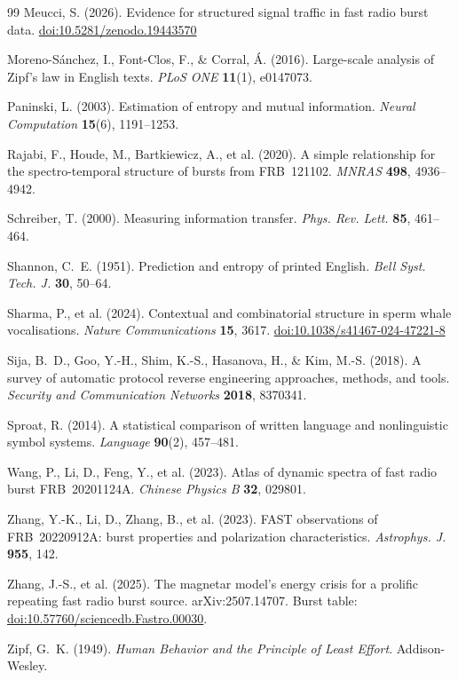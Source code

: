 \documentclass[11pt,a4paper]{article}
\providecommand{\doi}[1]{\href{https://doi.org/#1}{doi:#1}}
\begin{document}
\begin{thebibliography}{99}
 Meucci, S. (2026). Evidence for structured signal traffic in fast
radio burst data. \doi{10.5281/zenodo.19443570}

 Moreno-S\'anchez, I., Font-Clos, F., \& Corral, \'A. (2016).
Large-scale analysis of Zipf's law in English texts. \emph{PLoS ONE} \textbf{11}(1),
e0147073.

 Paninski, L. (2003). Estimation of entropy and mutual
information. \emph{Neural Computation} \textbf{15}(6), 1191--1253.

 Rajabi, F., Houde, M., Bartkiewicz, A., et al. (2020). A simple
relationship for the spectro-temporal structure of bursts from FRB~121102.
\emph{MNRAS} \textbf{498}, 4936--4942.

 Schreiber, T. (2000). Measuring information transfer.
\emph{Phys. Rev. Lett.} \textbf{85}, 461--464.

 Shannon, C.~E. (1951). Prediction and entropy of printed English.
\emph{Bell Syst. Tech. J.} \textbf{30}, 50--64.

 Sharma, P., et al. (2024). Contextual and combinatorial structure
in sperm whale vocalisations. \emph{Nature Communications} \textbf{15}, 3617.
\doi{10.1038/s41467-024-47221-8}

 Sija, B.~D., Goo, Y.-H., Shim, K.-S., Hasanova, H., \& Kim, M.-S.
(2018). A survey of automatic protocol reverse engineering approaches, methods, and
tools. \emph{Security and Communication Networks} \textbf{2018}, 8370341.

 Sproat, R. (2014). A statistical comparison of written language and
nonlinguistic symbol systems. \emph{Language} \textbf{90}(2), 457--481.

 Wang, P., Li, D., Feng, Y., et al. (2023). Atlas of dynamic spectra
of fast radio burst FRB~20201124A. \emph{Chinese Physics B} \textbf{32}, 029801.

 Zhang, Y.-K., Li, D., Zhang, B., et al. (2023). FAST observations
of FRB~20220912A: burst properties and polarization characteristics.
\emph{Astrophys. J.} \textbf{955}, 142.

 Zhang, J.-S., et al. (2025). The magnetar model's energy crisis
for a prolific repeating fast radio burst source. arXiv:2507.14707. Burst table:
\doi{10.57760/sciencedb.Fastro.00030}.

 Zipf, G.~K. (1949). \emph{Human Behavior and the Principle of Least
Effort}. Addison-Wesley.

\end{thebibliography}
\end{document}
